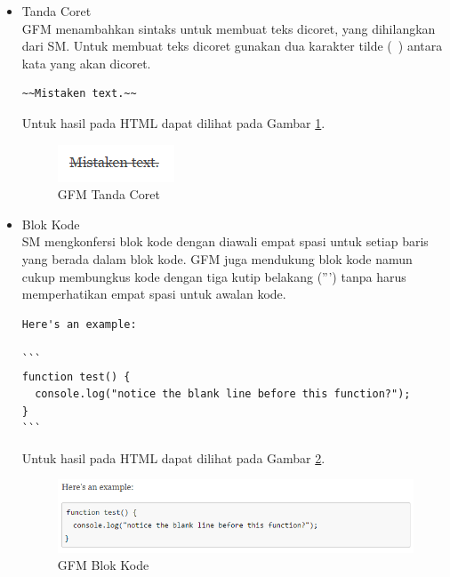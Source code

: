 \begin{itemize}
\begin{itemize}
\begin{itemize}
\item Tanda Coret\\
GFM menambahkan sintaks untuk membuat teks dicoret, yang dihilangkan dari SM.
Untuk membuat teks dicoret gunakan dua karakter tilde (~) antara kata yang akan
dicoret.
\begin{lstlisting}[basicstyle=\footnotesize]
~~Mistaken text.~~
\end{lstlisting}
Untuk hasil pada HTML dapat dilihat pada Gambar \ref{fig:tc}.
\begin{figure}[H]
\centering
\includegraphics[scale=1]{Gambar/tc.png}
\caption[GFM Tanda Coret]{GFM Tanda Coret}
\label{fig:tc}
\end{figure}

\item Blok Kode\\
SM mengkonfersi blok kode dengan diawali empat spasi untuk setiap baris yang
berada dalam blok kode. GFM juga mendukung blok kode namun cukup membungkus kode
dengan tiga kutip belakang (''') tanpa harus memperhatikan empat spasi untuk
awalan kode.
\begin{lstlisting}[basicstyle=\footnotesize]
Here's an example:

```
function test() {
  console.log("notice the blank line before this function?");
}
```
\end{lstlisting}
Untuk hasil pada HTML dapat dilihat pada Gambar \ref{fig:blokkode}.
\begin{figure}[H]
\centering
\includegraphics[scale=0.6]{Gambar/blokkode.png}
\caption[GFM Blok Kode]{GFM Blok Kode}
\label{fig:blokkode}
\end{figure}


\end{itemize}
\end{itemize}
\end{itemize}
